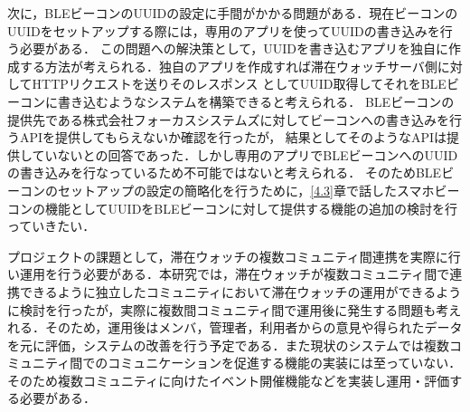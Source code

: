 次に，BLEビーコンのUUIDの設定に手間がかかる問題がある．現在ビーコンのUUIDをセットアップする際には，専用のアプリを使ってUUIDの書き込みを行う必要がある．
この問題への解決策として，UUIDを書き込むアプリを独自に作成する方法が考えられる．独自のアプリを作成すれば滞在ウォッチサーバ側に対してHTTPリクエストを送りそのレスポンス
としてUUID取得してそれをBLEビーコンに書き込むようなシステムを構築できると考えられる．
BLEビーコンの提供先である株式会社フォーカスシステムズに対してビーコンへの書き込みを行うAPIを提供してもらえないか確認を行ったが，
結果としてそのようなAPIは提供していないとの回答であった．しかし専用のアプリでBLEビーコンへのUUIDの書き込みを行なっているため不可能ではないと考えられる．
そのためBLEビーコンのセットアップの設定の簡略化を行うために，\ref{4.3}章で話したスマホビーコンの機能としてUUIDをBLEビーコンに対して提供する機能の追加の検討を行っていきたい．

プロジェクトの課題として，滞在ウォッチの複数コミュニティ間連携を実際に行い運用を行う必要がある．本研究では，滞在ウォッチが複数コミュニティ間で連携できるように独立したコミュニティにおいて滞在ウォッチの運用ができるように検討を行ったが，実際に複数間コミュニティ間で運用後に発生する問題も考えれる．そのため，運用後はメンバ，管理者，利用者からの意見や得られたデータを元に評価，システムの改善を行う予定である．また現状のシステムでは複数コミュニティ間でのコミュニケーションを促進する機能の実装には至っていない．
そのため複数コミュニティに向けたイベント開催機能などを実装し運用・評価する必要がある．



